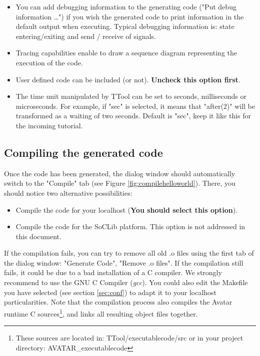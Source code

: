 \documentclass[12pt]{article}
\begin{document}
\begin{itemize}
\item You can add debugging information to the generating code ("Put debug information \ldots") if you wish the generated code to print information in the default output when executing. Typical debugging information is: state entering/exiting and send / receive of signals.
\item Tracing capabilities enable to draw a sequence diagram representing the execution of the code.
\item User defined code can be included (or not). \textbf{Uncheck this option first}.
\item The time unit manipulated by TTool can be set to seconds, milliseconds or microseconds. For example, if "sec" is selected, it means that  "after(2)" will be transformed as a waiting of two seconds. Default is "sec", keep it like this for the incoming tutorial.
\end{itemize}

\subsection{Compiling the generated code}
Once the code has been generated, the dialog window should automatically switch to the "Compile" tab (see Figure \ref{fig:compilehelloworld}). There, you should notice two alternative possibilities:
\begin{itemize}
\item Compile the code for your localhost (\textbf{You should select this option}).
\item Compile the code for the SoCLib platform. This option is not addressed in this document.
\end{itemize}
If the compilation fails, you can try to remove all old .o files using the first tab of the dialog window: "Generate Code", "Remove .o files". If the compilation still fails, it could be due to a bad installation of a C compiler. We strongly recommend to use the GNU C Compiler (\textit{gcc}). You could also edit the Makefile you have selected (see section \ref{sec:conf}) to adapt it to your localhost particularities.  Note that the compilation process also compiles the Avatar runtime C sources\footnote{These sources are located in: TTool/executablecode/src or in your project directory: AVATAR\_executablecode}, and links all resulting object files together.
\end{document}
